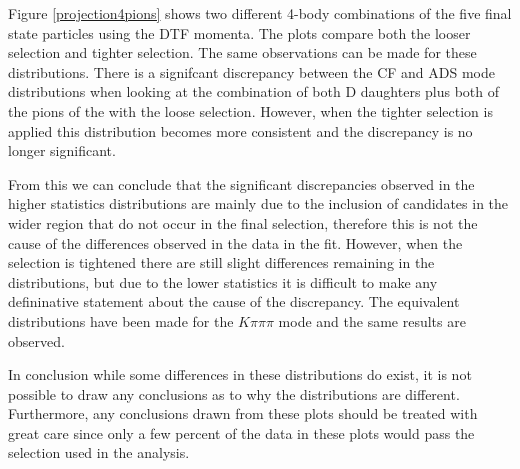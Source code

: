 Figure \ref{projection4pions} shows two different 4-body combinations of the five final state particles using the DTF momenta. The plots compare both the looser \Kstar selection and tighter \Kstar selection. The same observations can be made for these distributions. There is a signifcant discrepancy between the CF and ADS mode distributions when looking at the combination of both D daughters plus both of the pions of the \KS with the loose \Kstar selection. However, when the tighter \Kstar selection is applied this distribution becomes more consistent and the discrepancy is no longer significant. 

From this we can conclude that the significant discrepancies observed in the higher statistics distributions are mainly due to the inclusion of candidates in the wider \Kstar region that do not occur in the final selection, therefore this is not the cause of the differences observed in the data in the fit. However, when the \Kstar selection is tightened there are still slight differences remaining in the distributions, but due to the lower statistics it is difficult to make any defininative statement about the cause of the discrepancy. The equivalent distributions have been made for the $K\pi\pi\pi$ mode and the same results are observed.

%

In conclusion while some differences in these distributions do exist, it is not possible to draw any conclusions as to why the distributions are different. Furthermore, any conclusions drawn from these plots should be treated with great care since only a few percent of the data in these plots would pass the \Kstarm selection used in the analysis.   


